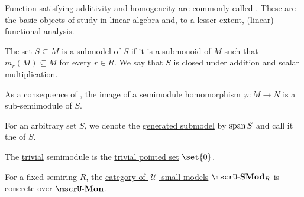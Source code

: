 \begin{definition}
\begin{thmenum}
    Function satisfying additivity and homogeneity are commonly called . These are the basic objects of study in \hyperref[sec:linear_algebra]{linear algebra} and, to a lesser extent, (linear) \hyperref[sec:functional_analysis]{functional analysis}.

     The set \( S \subseteq M \) is a \hyperref[thm:substructure_is_model]{submodel} of \( S \) if it is a \hyperref[def:monoid/submodel]{submonoid} of \( M \) such that \( m_r(M) \subseteq M \) for every \( r \in R \). We say that \( S \) is closed under addition and scalar multiplication.

    As a consequence of , the \hyperref[def:multi_valued_function/image]{image} of a semimodule homomorphism \( \varphi: M \to N \) is a sub-semimodule of \( S \).

    For an arbitrary set \( S \), we denote the \hyperref[def:first_order_generated_substructure]{generated submodel} by \( \operatorname{span}{ S } \) and call it the  of \( S \).

     The \hyperref[thm:substructures_form_complete_lattice/bottom]{trivial} semimodule is the \hyperref[def:pointed_set/trivial]{trivial pointed set} \( \set{ 0 } \).

     For a fixed semiring \( R \), the \hyperref[def:category_of_small_first_order_models]{category of \( \mscrU \)-small models} \( \ucat{SMod}_R \) is \hyperref[def:concrete_category]{concrete} over \hyperref[def:monoid]{\( \ucat{Mon} \)}.
  \end{thmenum}
\end{definition}
